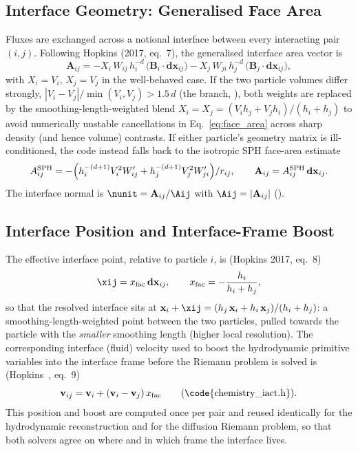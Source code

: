 \subsection{Interface Geometry: Generalised Face Area}
\label{sec:face-area}
Fluxes are exchanged across a notional interface between every
interacting pair $(i,j)$. Following Hopkins (2017, eq.~7), the
generalised interface area vector is
\begin{equation}
  \label{eq:face_area}
  \mathbf A_{ij} = -X_i\, W_{ij}\, h_i^{-d}\, \big(\mathbf B_i \cdot \mathbf{dx}_{ij}\big)
                   -X_j\, W_{ji}\, h_j^{-d}\, \big(\mathbf B_j \cdot \mathbf{dx}_{ij}\big) ,
\end{equation}
with $X_i = V_i$, $X_j = V_j$ in the well-behaved case. If the two
particle volumes differ strongly,
$|V_i-V_j|/\min(V_i,V_j) > 1.5\, d$ (the 
branch, ), both weights are replaced by
the smoothing-length-weighted blend
$X_i = X_j = (V_i h_j + V_j h_i)/(h_i+h_j)$
to avoid numerically unstable cancellations in
Eq.~\eqref{eq:face_area} across sharp density (and hence volume)
contrasts. If either particle's geometry matrix is ill-conditioned, the
code instead falls back to the isotropic SPH face-area estimate
\begin{equation}
  A_{ij}^{\rm SPH} = -\Big(h_i^{-(d+1)} V_i^2 W'_{ij} + h_j^{-(d+1)} V_j^2 W'_{ji}\Big)/r_{ij} ,
  \qquad \mathbf A_{ij} = A_{ij}^{\rm SPH}\, \mathbf{dx}_{ij} .
\end{equation}
The interface normal is $\nunit = \mathbf A_{ij}/\Aij$ with
$\Aij = |\mathbf A_{ij}|$
().

\subsection{Interface Position and Interface-Frame Boost}
\label{sec:interface-position}
The effective interface point, relative to particle $i$, is (Hopkins
2017, eq.~8)
\begin{equation}
  \label{eq:interface_position}
  \xij = x_{\rm fac}\, \mathbf{dx}_{ij} , \qquad
  x_{\rm fac} = -\frac{h_i}{h_i+h_j} ,
\end{equation}
so that the resolved interface sits at
$\mathbf x_i + \xij = (h_j\, \mathbf x_i + h_i\, \mathbf x_j)/(h_i+h_j)$:
a smoothing-length-weighted point between the two particles, pulled
towards the particle with the \emph{smaller} smoothing length (higher
local resolution). The corresponding interface (fluid) velocity used to
boost the hydrodynamic primitive variables into the interface frame
before the Riemann problem is solved is (Hopkins~\citeyear{Hopkins2017diffusion}, eq.~9)
\begin{equation}
  \mathbf v_{ij} = \mathbf v_i + (\mathbf v_i - \mathbf v_j)\, x_{\rm fac}
  \qquad \text{(\code{chemistry\_iact.h})} .
\end{equation}
This position and boost are computed once per pair and reused
identically for the hydrodynamic reconstruction and for the diffusion
Riemann problem, so that both solvers agree on where and in which frame
the interface lives.

